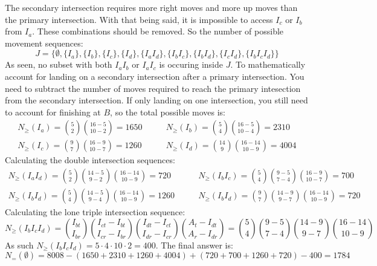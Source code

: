 \documentclass{article}
\begin{document}
\begin{enumerate}[(a)]
\begin{equation*}
    \end{equation*}
    The secondary intersection requires more right moves and more up moves than the primary intersection. With that being said, it is impossible to access $I_c$ or $I_b$ from $I_a$. These combinations should be removed. So the number of possible movement sequences:
    \begin{equation*}
        J = \{\emptyset, \{I_a\}, \{I_b\}, \{I_c\}, \{I_d\}, \{I_aI_d\}, \{I_bI_c\}, \{I_bI_d\}, \{I_cI_d\}, \{I_b I_c I_d\}\}
    \end{equation*}
    As seen, no subset with both $I_a I_b$ or $I_a I_c$ is occuring inside $J$. To mathematically account for landing on a secondary intersection after a primary intersection. You need to subtract the number of moves required to reach the primary intesection from the secondary intersection. If only landing on one intersection, you still need to account for finishing at $B$, so the total possible moves is:
    \begin{align*}
    N_{\ge}(I_a) = \binom{5}{2}\binom{16-5}{10-2} = 1650 \quad \quad & N_{\ge}(I_b) = \binom{5}{4}\binom{16-5}{10-4} = 2310 \\
    N_{\ge}(I_c) = \binom{9}{7}\binom{16-9}{10-7} = 1260 \quad \quad & N_{\ge}(I_d) = \binom{14}{9}\binom{16-14}{10-9} = 4004
    \end{align*}
    Calculating the double intersection sequences:
    \begin{align*}
    N_{\ge}(I_a I_d) = \binom{5}{2}\binom{14-5}{9-2}\binom{16-14}{10-9} = 720 \quad \quad & N_{\ge}(I_b I_c) = \binom{5}{4}\binom{9-5}{7-4}\binom{16-9}{10-7} = 700 \\
    N_{\ge}(I_b I_d) = \binom{5}{4}\binom{14-5}{9-4}\binom{16-14}{10-9} = 1260 \quad \quad & N_{\ge}(I_b I_d) = \binom{9}{7}\binom{14-9}{9-7}\binom{16-14}{10-9} = 720
    \end{align*}
    Calculating the lone triple intersection sequence:
    \begin{equation*}
        N_{\ge}(I_b I_c I_d) = \binom{I_{bt}}{I_{br}}\binom{I_{ct}-I_{bt}}{I_{cr}-I_{br}}\binom{I_{dt}-I_{ct}}{I_{dr}-I_{cr}}\binom{A_t - I_{dt}}{A_r - I_{dr}} = \binom{5}{4}\binom{9-5}{7-4}\binom{14-9}{9-7}\binom{16-14}{10-9}
    \end{equation*}
    As such $N_{\ge}(I_b I_c I_d) = 5 \cdot 4 \cdot 10 \cdot 2 = 400$. The final answer is:
    \begin{equation*}
        N_{=}(\emptyset) = 8008 - (1650 + 2310 + 1260 + 4004) + (720 + 700 + 1260 + 720) - 400 = 1784
    \end{equation*}
    

\end{enumerate}
\end{document}
